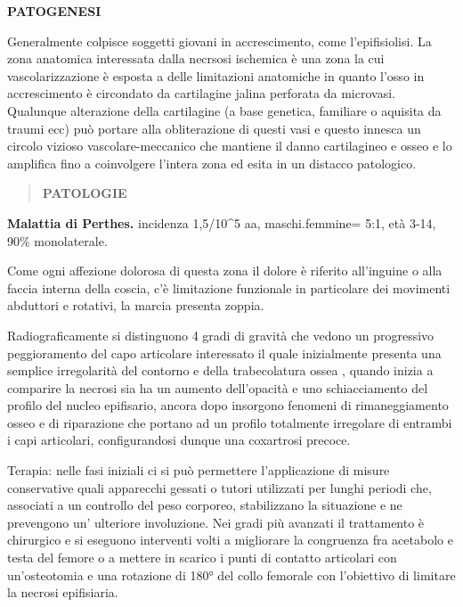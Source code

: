 \documentclass[]{article}
\begin{document}
\textbf{PATOGENESI}

Generalmente colpisce soggetti giovani in accrescimento, come
l'epifisiolisi. La zona anatomica interessata dalla necrsosi ischemica è
una zona la cui vascolarizzazione è esposta a delle limitazioni
anatomiche in quanto l'osso in accrescimento è circondato da cartilagine
jalina perforata da microvasi. Qualunque alterazione della cartilagine
(a base genetica, familiare o aquisita da traumi ecc) può portare alla
obliterazione di questi vasi e questo innesca un circolo vizioso
vascolare-meccanico che mantiene il danno cartilagineo e osseo e lo
amplifica fino a coinvolgere l'intera zona ed esita in un distacco
patologico.

\begin{quote}
\textbf{PATOLOGIE}
\end{quote}

\textbf{Malattia di Perthes.} incidenza 1,5/10\^{}5 aa, maschi.femmine=
5:1, età 3-14, 90\% monolaterale.

Come ogni affezione dolorosa di questa zona il dolore è riferito
all'inguine o alla faccia interna della coscia, c'è limitazione
funzionale in particolare dei movimenti abduttori e rotativi, la marcia
presenta zoppia.

Radiograficamente si distinguono 4 gradi di gravità che vedono un
progressivo peggioramento del capo articolare interessato il quale
inizialmente presenta una semplice irregolarità del contorno e della
trabecolatura ossea , quando inizia a comparire la necrosi sia ha un
aumento dell'opacità e uno schiacciamento del profilo del nucleo
epifisario, ancora dopo insorgono fenomeni di rimaneggiamento osseo e di
riparazione che portano ad un profilo totalmente irregolare di entrambi
i capi articolari, configurandosi dunque una coxartrosi precoce.

Terapia: nelle fasi iniziali ci si può permettere l'applicazione di
misure conservative quali apparecchi gessati o tutori utilizzati per
lunghi periodi che, associati a un controllo del peso corporeo,
stabilizzano la situazione e ne prevengono un' ulteriore involuzione.
Nei gradi più avanzati il trattamento è chirurgico e si eseguono
interventi volti a migliorare la congruenza fra acetabolo e testa del
femore o a mettere in scarico i punti di contatto articolari con
un'osteotomia e una rotazione di 180° del collo femorale con l'obiettivo
di limitare la necrosi epifisiaria.
\end{document}
